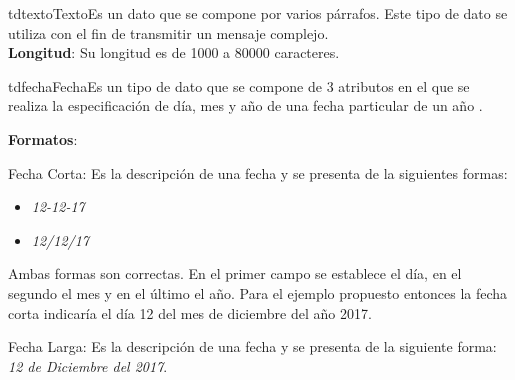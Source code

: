 \begin{TipoDeDato}{tdtexto}{Texto}{Es un dato que se compone por varios párrafos. Este tipo de dato se utiliza con el fin de transmitir un mensaje complejo.\\}
		\textbf{Longitud}: Su longitud es de 1000 a 80000 caracteres.

\end{TipoDeDato}
		
\begin{TipoDeDato}{tdfecha}{Fecha}{Es un tipo de dato que se compone de 3 atributos  en el que se realiza la especificación de día, mes y año de una fecha particular de un año . }

	\textbf{Formatos}: \cdtEmpty
		\begin{Citemize}
			\item Fecha Corta: Es la descripción de una fecha y se presenta de la siguientes formas:
				\begin{itemize}
					\item \textit{12-12-17}
					\item \textit{12/12/17}
				\end{itemize} 
			Ambas formas son correctas. En el primer campo se establece el día, en el segundo el mes y en el último el año. Para el ejemplo propuesto entonces la fecha corta indicaría el día 12 del mes de diciembre del año 2017.
			
			\item Fecha Larga: Es la descripción de una fecha y se presenta de la siguiente forma:
				\textit{12 de Diciembre del 2017}.
		\end{Citemize}
\end{TipoDeDato}

